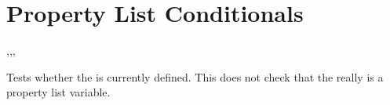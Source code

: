 \documentclass[oneside]{book}
\begin{document}


\section{Property List Conditionals}

\begin{function}{\PropIfExist,\PropIfExistT,\PropIfExistF,\PropIfExistTF}
\begin{syntax}
 
  
  
   
\end{syntax}
Tests whether the  is currently defined.  This does not
check that the  really is a property list variable.
\begin{demohigh}
\PropIfExistTF {} {}
\PropIfExistTF {} {}
\end{demohigh}
\end{function}
\end{document}
